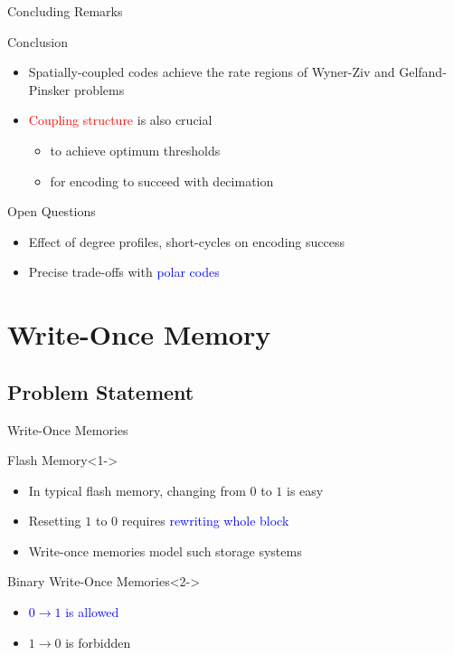 \documentclass[10pt,presentation]{beamer}
\def\WOM_path{../compound-codes/WOM/slides/Figures}
\begin{document}
\begin{frame}{Concluding Remarks}
  \begin{block}{Conclusion}
    \begin{itemize}
    \item Spatially-coupled codes achieve the rate regions of Wyner-Ziv and Gelfand-Pinsker problems \vspace{0.2cm}
    \item \textcolor{red}{Coupling structure} is also crucial 
      \begin{itemize}
      \item to achieve optimum thresholds
      \item for encoding to succeed with decimation 
      \end{itemize}
    \end{itemize}
  \end{block}
  \begin{block}{Open Questions}
    \begin{itemize}
    \item Effect of degree profiles, short-cycles on encoding success \vspace{0.2cm}
    \item Precise trade-offs with \textcolor{blue}{polar codes}
    \end{itemize}
  \end{block}
\end{frame}

\section{Write-Once Memory}
\subsection{Problem Statement}
\begin{frame}{Write-Once Memories}
  \begin{center}
    \scalebox{0.5}{}    
  \end{center}
  \begin{block}{Flash Memory}<1->
    \begin{itemize}
    \item In typical flash memory, changing from $0$ to $1$ is easy
    \item Resetting $1$ to $0$ requires \textcolor{blue}{rewriting whole block}
    \item Write-once memories model such storage systems
    \end{itemize}
  \end{block}
  \begin{block}{Binary Write-Once Memories}<2->
    \begin{itemize}
    \item<2-> \textcolor{blue}{$0 \longrightarrow 1$ is allowed}
    \item<3-> \alert{$1 \longrightarrow 0$ is forbidden}
    \end{itemize}
  \end{block}
\end{frame}
\end{document}
